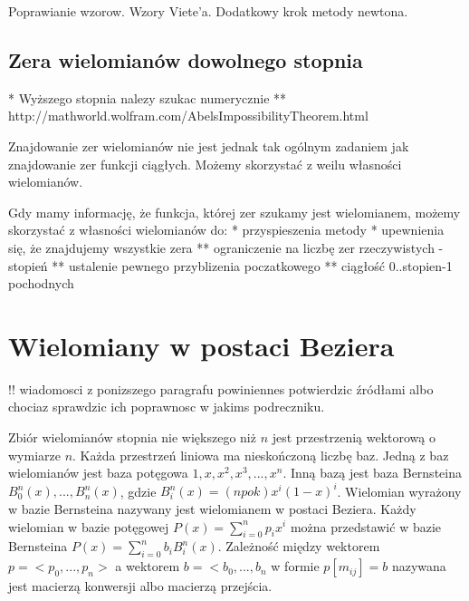 \documentclass[11pt,a4paper,oneside]{report}
\begin{document}
Poprawianie wzorow. Wzory Viete'a. Dodatkowy krok metody newtona.

\subsection{Zera wielomianów dowolnego stopnia}

* Wyższego stopnia nalezy szukac numerycznie
** http://mathworld.wolfram.com/AbelsImpossibilityTheorem.html

Znajdowanie zer wielomianów nie jest jednak tak ogólnym zadaniem jak znajdowanie zer funkcji ciągłych. Możemy skorzystać z weilu własności wielomianów.

Gdy mamy informację, że funkcja, której zer szukamy jest wielomianem, możemy skorzystać z własności wielomianów do:
* przyspieszenia metody
* upewnienia się, że znajdujemy wszystkie zera
** ograniczenie na liczbę zer rzeczywistych - stopień
** ustalenie pewnego przyblizenia poczatkowego
** ciągłość 0..stopien-1 pochodnych



\section{Wielomiany w postaci Beziera}

!! wiadomosci z ponizszego paragrafu powiniennes potwierdzic źródłami albo chociaz sprawdzic ich poprawnosc w jakims podreczniku.

Zbiór wielomianów stopnia nie większego niż $n$ jest przestrzenią wektorową o wymiarze $n$. Każda przestrzeń liniowa ma nieskończoną liczbę baz. Jedną z baz wielomianów jest baza potęgowa ${1,x,x^2,x^3,...,x^n}$. Inną bazą jest baza Bernsteina ${B^n_0(x),...,B^n_n(x)}$, gdzie $B^n_i(x) = (n po k)x^i(1-x)^i$. Wielomian wyrażony w bazie Bernsteina nazywany jest wielomianem w postaci Beziera. Każdy wielomian w bazie potęgowej $P(x) = \sum^n_{i=0}p_i x^i$ można przedstawić w bazie Bernsteina $P(x) = \sum^n_{i=0}b_i B^n_i(x)$. Zależność między wektorem $p = <p_0,...,p_n>$ a wektorem $b = <b_0, ..., b_n$ w formie $p [ m_{ij} ] = b$ nazywana jest macierzą konwersji albo macierzą przejścia.
\end{document}
